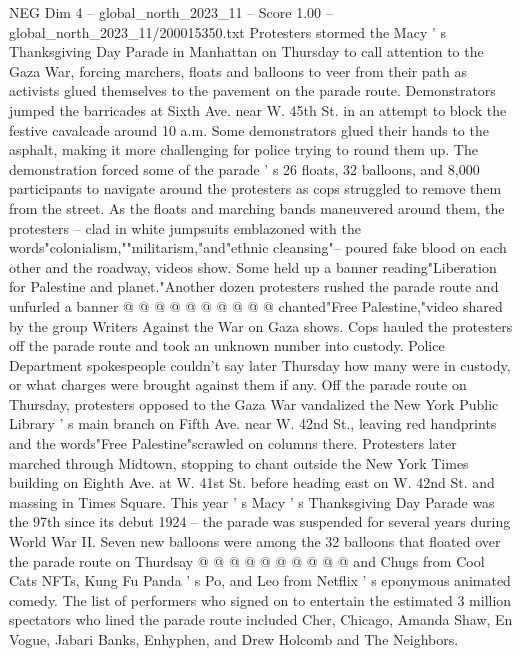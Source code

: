 \begin{textsample}{NEG Dim 4 – global\_north\_2023\_11 – Score 1.00 – global\_north\_2023\_11/200015350.txt}  \label{ex:f4_neg_251}
Protesters stormed the Macy ' s Thanksgiving Day Parade in Manhattan on Thursday to call attention to the Gaza War, forcing marchers, floats and balloons to veer from their path as activists glued themselves to the pavement on the parade route.
Demonstrators jumped the barricades at Sixth Ave. near W. 45th St. in an attempt to block the festive cavalcade around 10 a.m.
Some demonstrators glued their hands to the asphalt, making it more challenging for police trying to round them up.
The demonstration forced some of the parade ' s 26 floats, 32 balloons, and 8,000 participants to navigate around the protesters as cops struggled to remove them from the street.
As the floats and marching bands maneuvered around them, the protesters -- clad in white jumpsuits emblazoned with the words"colonialism,""militarism,"and"ethnic cleansing"-- poured fake blood on each other and the roadway, videos show.
Some held up a banner reading"Liberation for Palestine and planet."Another dozen protesters rushed the parade route and unfurled a banner @ @ @ @ @ @ @ @ @ @ chanted"Free Palestine,"video shared by the group Writers Against the War on Gaza shows.
Cops hauled the protesters off the parade route and took an unknown number into custody.
Police Department spokespeople couldn't say later Thursday how many were in custody, or what charges were brought against them if any.
Off the parade route on Thursday, protesters opposed to the Gaza War vandalized the New York Public Library ' s main branch on Fifth Ave. near W. 42nd St., leaving red handprints and the words"Free Palestine"scrawled on columns there.
Protesters later marched through Midtown, stopping to chant outside the New York Times building on Eighth Ave. at W. 41st St. before heading east on W. 42nd St. and massing in Times Square.
This year ' s Macy ' s Thanksgiving Day Parade was the 97th since its debut 1924 -- the parade was suspended for several years during World War II.
Seven new balloons were among the 32 balloons that floated over the parade route on Thurdsay @ @ @ @ @ @ @ @ @ @ and Chugs from Cool Cats NFTs, Kung Fu Panda ' s Po, and Leo from Netflix ' s eponymous animated comedy.
The list of performers who signed on to entertain the estimated 3 million spectators who lined the parade route included Cher, Chicago, Amanda Shaw, En Vogue, Jabari Banks, Enhyphen, and Drew Holcomb and The Neighbors.

\end{textsample}
